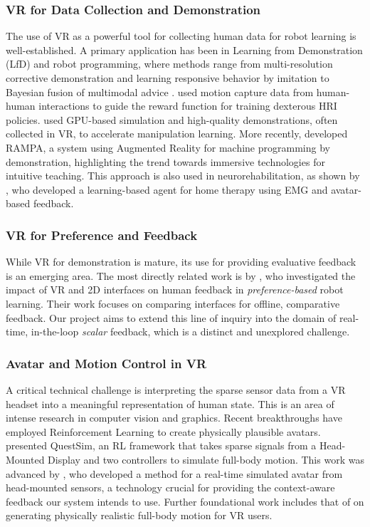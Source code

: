 \documentclass[rnd]{mas_proposal}
\begin{document}
\subsubsection{VR for Data Collection and Demonstration}
The use of VR as a powerful tool for collecting human data for robot learning is well-established. A primary application has been in Learning from Demonstration (LfD) and robot programming, where methods range from multi-resolution corrective demonstration \citep{6225294} and learning responsive behavior by imitation \citep{6696819} to Bayesian fusion of multimodal advice \citep{9794595}. \citet{Christen2019} used motion capture data from human-human interactions to guide the reward function for training dexterous HRI policies. \citet{Mosbach2022} used GPU-based simulation and high-quality demonstrations, often collected in VR, to accelerate manipulation learning. More recently, \citet{10904309} developed RAMPA, a system using Augmented Reality for machine programming by demonstration, highlighting the trend towards immersive technologies for intuitive teaching. This approach is also used in neurorehabilitation, as shown by \citet{8009418}, who developed a learning-based agent for home therapy using EMG and avatar-based feedback.

\subsubsection{VR for Preference and Feedback}
While VR for demonstration is mature, its use for providing evaluative feedback is an emerging area. The most directly related work is by \citet{Heuvel2025}, who investigated the impact of VR and 2D interfaces on human feedback in \textit{preference-based} robot learning. Their work focuses on comparing interfaces for offline, comparative feedback. Our project aims to extend this line of inquiry into the domain of real-time, in-the-loop \textit{scalar} feedback, which is a distinct and unexplored challenge.

\subsubsection{Avatar and Motion Control in VR}
A critical technical challenge is interpreting the sparse sensor data from a VR headset into a meaningful representation of human state. This is an area of intense research in computer vision and graphics. Recent breakthroughs have employed Reinforcement Learning to create physically plausible avatars. \citet{Winkler2022} presented QuestSim, an RL framework that takes sparse signals from a Head-Mounted Display and two controllers to simulate full-body motion. This work was advanced by \citet{Luo2024}, who developed a method for a real-time simulated avatar from head-mounted sensors, a technology crucial for providing the context-aware feedback our system intends to use. Further foundational work includes that of \citet{Ye2022} on generating physically realistic full-body motion for VR users.
\end{document}
